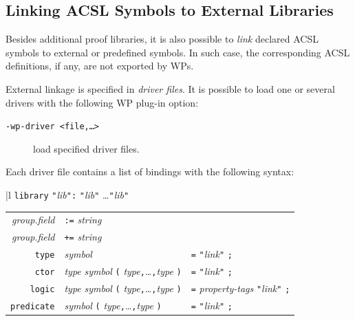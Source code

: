 \subsection{Linking \textsf{ACSL} Symbols to External Libraries}
\label{drivers}

Besides additional proof libraries, it is also possible to
\emph{link} declared \textsf{ACSL} symbols to external or predefined
symbols. In such case, the corresponding \textsf{ACSL} definitions,
if any, are not exported by \textsf{WP}s.

External linkage is specified in \emph{driver files}. It is possible
to load one or several drivers with the following \textsf{WP} plug-in option:
\begin{description}
\item[\tt -wp-driver <file,\ldots>] load specified driver files.

\end{description}

\newcommand{\ccc}{\texttt{,}\ldots\texttt{,}}
\newcommand{\user}[1]{\texttt{"}\textit{#1}\texttt{"}}
Each driver file contains a list of bindings with the following syntax:
\begin{center}
  \begin{tabular}{|l}
  \texttt{library} \user{lib}\verb':' \user{lib} \ldots \user{lib} \\
  \quad\begin{tabular}{rll}
  \rule{0em}{1.2em}
  \textit{group}.\textit{field} &\texttt{:=} \textit{string} \\
  \textit{group}.\textit{field} &\texttt{+=} \textit{string} \\
  \texttt{type} & \textit{symbol} & \verb'=' \user{link} \verb';' \\
  \texttt{ctor} & \textit{type} \textit{symbol}
                   \verb'(' \textit{type}\ccc\textit{type} \verb')'
                 & \verb'=' \user{link} \verb';' \\
  \texttt{logic} & \textit{type} \textit{symbol}
                   \verb'(' \textit{type}\ccc\textit{type} \verb')'
                 & \verb'=' \textit{property-tags} \user{link} \verb';' \\
  \texttt{predicate} & \textit{symbol}
                   \verb'(' \textit{type}\ccc\textit{type} \verb')'
                 & \verb'=' \user{link} \verb';'
  \end{tabular}
  \end{tabular}
\end{center}

